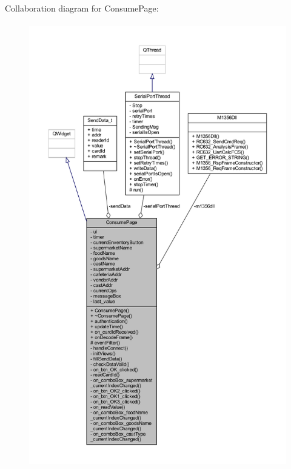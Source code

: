 Collaboration diagram for Consume\+Page\+:
\nopagebreak
\begin{figure}[H]
\begin{center}
\leavevmode
\includegraphics[height=550pt]{class_consume_page__coll__graph}
\end{center}
\end{figure}
